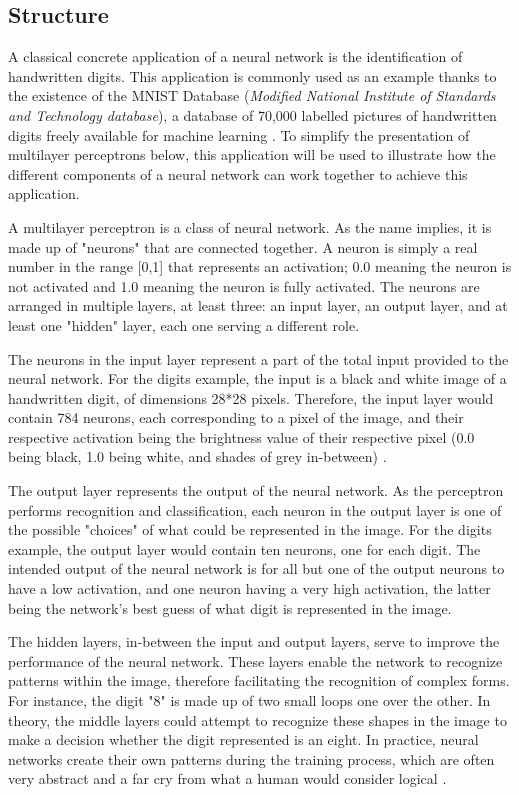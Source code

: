 \documentclass[12pt,a4paper,notitlepage]{article}
\begin{document}
\subsection{Structure}
A classical concrete application of a neural network is the identification of handwritten digits. This application is commonly used as an example thanks to the existence of the MNIST Database (\textit{Modified National Institute of Standards and Technology database}), a database of 70,000 labelled pictures of handwritten digits freely available for machine learning \cite{lecun_mnist_1998}. To simplify the presentation of multilayer perceptrons below, this application will be used to illustrate how the different components of a neural network can work together to achieve this application.

A multilayer perceptron is a class of neural network. As the name implies, it is made up of "neurons" that are connected together. A neuron is simply a real number in the range [0,1] that represents an activation; 0.0 meaning the neuron is not activated and 1.0 meaning the neuron is fully activated. The neurons are arranged in multiple layers, at least three: an input layer, an output layer, and at least one "hidden" layer, each one serving a different role.

The neurons in the input layer represent a part of the total input provided to the neural network. For the digits example, the input is a black and white image of a handwritten digit, of dimensions 28*28 pixels. Therefore, the input layer would contain 784 neurons, each corresponding to a pixel of the image, and their respective activation being the brightness value of their respective pixel (0.0 being black, 1.0 being white, and shades of grey in-between) \cite{sanderson_but_2017}.

The output layer represents the output of the neural network. As the perceptron performs recognition and classification, each neuron in the output layer is one of the possible "choices" of what could be represented in the image. For the digits example, the output layer would contain ten neurons, one for each digit. The intended output of the neural network is for all but one of the output neurons to have a low activation, and one neuron having a very high activation, the latter being the network's best guess of what digit is represented in the image.

The hidden layers, in-between the input and output layers, serve to improve the performance of the neural network. These layers enable the network to recognize patterns within the image, therefore facilitating the recognition of complex forms. For instance, the digit "8" is made up of two small loops one over the other. In theory, the middle layers could attempt to recognize these shapes in the image to make a decision whether the digit represented is an eight. In practice, neural networks create their own patterns during the training process, which are often very abstract and a far cry from what a human would consider logical \cite{sanderson_gradient_2017}.
\end{document}
